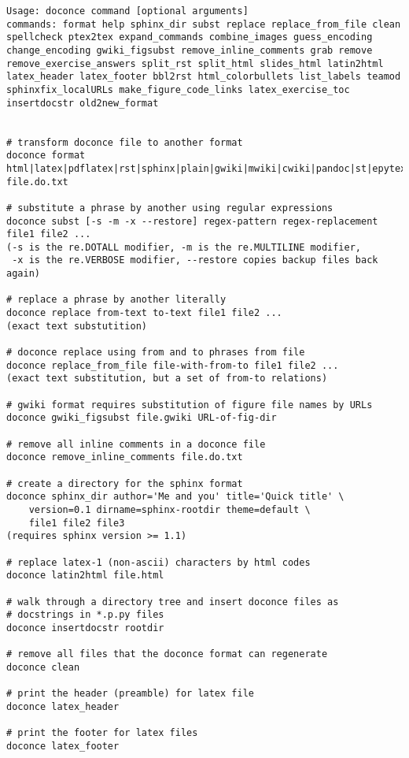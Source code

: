 \documentclass[%
oneside,                 %
final,                   %
10pt]{article}
\begin{document}
\begin{Verbatim}[numbers=none,fontsize=\fontsize{9pt}{9pt},baselinestretch=0.85,xleftmargin=0mm]
Usage: doconce command [optional arguments]
commands: format help sphinx_dir subst replace replace_from_file clean spellcheck ptex2tex expand_commands combine_images guess_encoding change_encoding gwiki_figsubst remove_inline_comments grab remove remove_exercise_answers split_rst split_html slides_html latin2html latex_header latex_footer bbl2rst html_colorbullets list_labels teamod sphinxfix_localURLs make_figure_code_links latex_exercise_toc insertdocstr old2new_format


# transform doconce file to another format
doconce format html|latex|pdflatex|rst|sphinx|plain|gwiki|mwiki|cwiki|pandoc|st|epytext file.do.txt

# substitute a phrase by another using regular expressions
doconce subst [-s -m -x --restore] regex-pattern regex-replacement file1 file2 ...
(-s is the re.DOTALL modifier, -m is the re.MULTILINE modifier,
 -x is the re.VERBOSE modifier, --restore copies backup files back again)

# replace a phrase by another literally
doconce replace from-text to-text file1 file2 ...
(exact text substutition)

# doconce replace using from and to phrases from file
doconce replace_from_file file-with-from-to file1 file2 ...
(exact text substitution, but a set of from-to relations)

# gwiki format requires substitution of figure file names by URLs
doconce gwiki_figsubst file.gwiki URL-of-fig-dir

# remove all inline comments in a doconce file
doconce remove_inline_comments file.do.txt

# create a directory for the sphinx format
doconce sphinx_dir author='Me and you' title='Quick title' \
    version=0.1 dirname=sphinx-rootdir theme=default \
    file1 file2 file3
(requires sphinx version >= 1.1)

# replace latex-1 (non-ascii) characters by html codes
doconce latin2html file.html

# walk through a directory tree and insert doconce files as
# docstrings in *.p.py files
doconce insertdocstr rootdir

# remove all files that the doconce format can regenerate
doconce clean

# print the header (preamble) for latex file
doconce latex_header

# print the footer for latex files
doconce latex_footer


\end{Verbatim}
\end{document}
